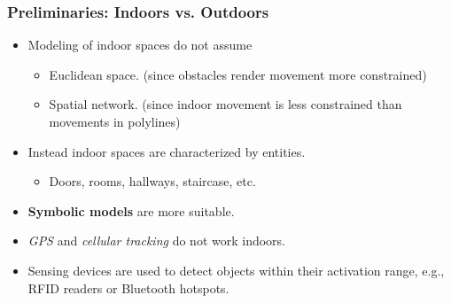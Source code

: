 \begin{frame}
\frametitle{Preliminaries: Indoors vs. Outdoors}

\begin{itemize}
  \item Modeling of indoor spaces do not assume
    \begin{itemize}
      \item Euclidean space. (since obstacles render movement more constrained)
      \item Spatial network. (since indoor movement is less constrained than movements in polylines)
    \end{itemize}

  \item Instead indoor spaces are characterized by entities.
    \begin{itemize}
      \item Doors, rooms, hallways, staircase, etc.
    \end{itemize}

  \item \textbf{Symbolic models} are more suitable.

  \item \emph{GPS} and \emph{cellular tracking} do not work indoors.

  \item Sensing devices are used to detect objects within their activation range, e.g., RFID readers or Bluetooth hotspots.
\end{itemize}

\end{frame}


